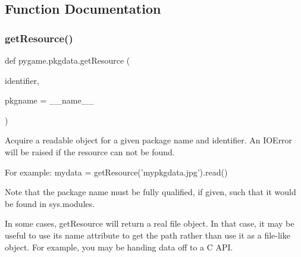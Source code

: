 \subsection{Function Documentation}
\mbox{\label{namespacepygame_1_1pkgdata_a781dc67594d56b559fbb71d979e6c135}} 
\subsubsection{\texorpdfstring{get\+Resource()}{getResource()}}
{\footnotesize\ttfamily def pygame.\+pkgdata.\+get\+Resource (\begin{DoxyParamCaption}\item[{}]{identifier,  }\item[{}]{pkgname = {\ttfamily \+\_\+\+\_\+name\+\_\+\+\_\+} }\end{DoxyParamCaption})}

\begin{DoxyVerb}Acquire a readable object for a given package name and identifier.
An IOError will be raised if the resource can not be found.

For example:
    mydata = getResource('mypkgdata.jpg').read()

Note that the package name must be fully qualified, if given, such
that it would be found in sys.modules.

In some cases, getResource will return a real file object.  In that
case, it may be useful to use its name attribute to get the path
rather than use it as a file-like object.  For example, you may
be handing data off to a C API.
\end{DoxyVerb}
 